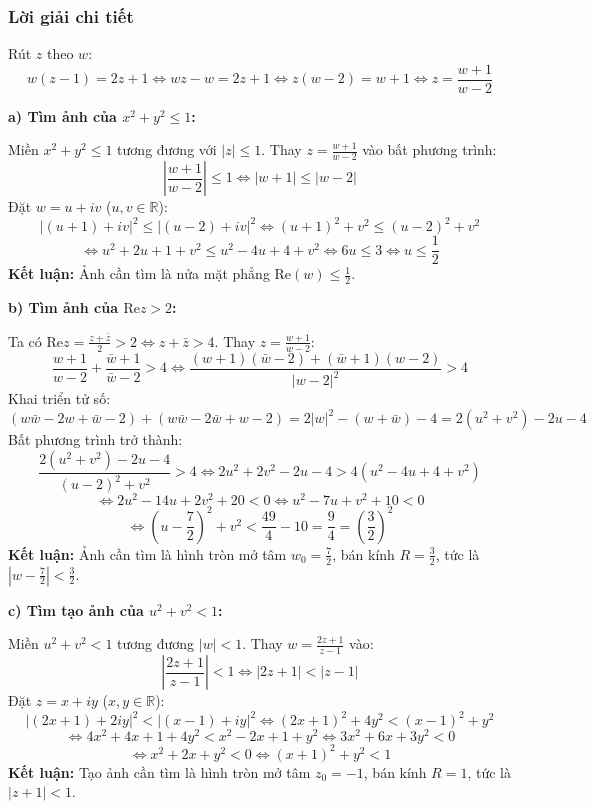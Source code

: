\documentclass[12pt,a4paper]{article}
\begin{document}
\subsubsection*{Lời giải chi tiết}

Rút $z$ theo $w$:
\[ w(z - 1) = 2z + 1 \iff wz - w = 2z + 1 \iff z(w - 2) = w + 1 \iff z = \frac{w + 1}{w - 2} \]

\noindent \textbf{a) Tìm ảnh của $x^2 + y^2 \le 1$:}

Miền $x^2 + y^2 \le 1$ tương đương với $|z| \le 1$. Thay $z = \frac{w + 1}{w - 2}$ vào bất phương trình:
\[ \left| \frac{w + 1}{w - 2} \right| \le 1 \iff |w + 1| \le |w - 2| \]
Đặt $w = u + iv$ ($u, v \in \mathbb{R}$):
\[ |(u + 1) + iv|^2 \le |(u - 2) + iv|^2 \iff (u + 1)^2 + v^2 \le (u - 2)^2 + v^2 \]
\[ \iff u^2 + 2u + 1 + v^2 \le u^2 - 4u + 4 + v^2 \iff 6u \le 3 \iff u \le \frac{1}{2} \]
\textbf{Kết luận:} Ảnh cần tìm là nửa mặt phẳng $\text{Re}(w) \le \frac{1}{2}$.

\bigskip
\noindent \textbf{b) Tìm ảnh của $\text{Re}z > 2$:}

Ta có $\text{Re}z = \frac{z + \bar{z}}{2} > 2 \iff z + \bar{z} > 4$. Thay $z = \frac{w + 1}{w - 2}$:
\[ \frac{w + 1}{w - 2} + \frac{\bar{w} + 1}{\bar{w} - 2} > 4 \iff \frac{(w + 1)(\bar{w} - 2) + (\bar{w} + 1)(w - 2)}{|w - 2|^2} > 4 \]
Khai triển tử số:
\[ (w\bar{w} - 2w + \bar{w} - 2) + (w\bar{w} - 2\bar{w} + w - 2) = 2|w|^2 - (w + \bar{w}) - 4 = 2(u^2 + v^2) - 2u - 4 \]
Bất phương trình trở thành:
\[ \frac{2(u^2 + v^2) - 2u - 4}{(u - 2)^2 + v^2} > 4 \iff 2u^2 + 2v^2 - 2u - 4 > 4(u^2 - 4u + 4 + v^2) \]
\[ \iff 2u^2 - 14u + 2v^2 + 20 < 0 \iff u^2 - 7u + v^2 + 10 < 0 \]
\[ \iff \left(u - \frac{7}{2}\right)^2 + v^2 < \frac{49}{4} - 10 = \frac{9}{4} = \left(\frac{3}{2}\right)^2 \]
\textbf{Kết luận:} Ảnh cần tìm là hình tròn mở tâm $w_0 = \frac{7}{2}$, bán kính $R = \frac{3}{2}$, tức là $\left| w - \frac{7}{2} \right| < \frac{3}{2}$.

\bigskip
\noindent \textbf{c) Tìm tạo ảnh của $u^2 + v^2 < 1$:}

Miền $u^2 + v^2 < 1$ tương đương $|w| < 1$. Thay $w = \frac{2z + 1}{z - 1}$ vào:
\[ \left| \frac{2z + 1}{z - 1} \right| < 1 \iff |2z + 1| < |z - 1| \]
Đặt $z = x + iy$ ($x, y \in \mathbb{R}$):
\[ |(2x + 1) + 2iy|^2 < |(x - 1) + iy|^2 \iff (2x + 1)^2 + 4y^2 < (x - 1)^2 + y^2 \]
\[ \iff 4x^2 + 4x + 1 + 4y^2 < x^2 - 2x + 1 + y^2 \iff 3x^2 + 6x + 3y^2 < 0 \]
\[ \iff x^2 + 2x + y^2 < 0 \iff (x + 1)^2 + y^2 < 1 \]
\textbf{Kết luận:} Tạo ảnh cần tìm là hình tròn mở tâm $z_0 = -1$, bán kính $R = 1$, tức là $|z + 1| < 1$.
\end{document}
